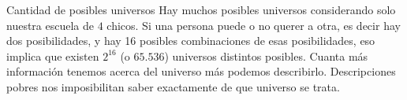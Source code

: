 

\begin{frame}{Cantidad de posibles universos}
  Hay muchos posibles universos considerando solo nuestra escuela de $4$ chicos.
  Si una persona puede o no querer a otra, es decir hay dos posibilidades, y
  hay 16 posibles combinaciones de esas posibilidades, eso implica que existen
  $2^{16}$ (o $65.536$) universos distintos posibles.
  \jump
  Cuanta más información tenemos acerca del universo más podemos describirlo.
  Descripciones pobres nos imposibilitan saber exactamente de que universo se trata.
\end{frame}


